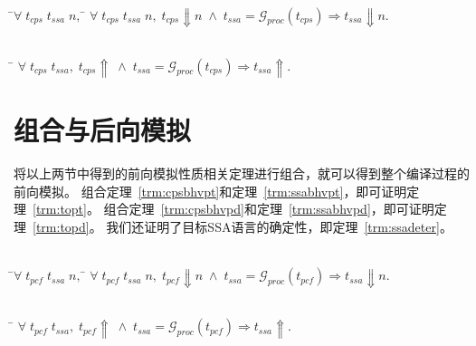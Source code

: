 \begin{theorem}[SSA程序对CPS程序终止行为的保存]\label{trm:ssabhvpt} 
    \begin{tabbing}
     \\
    \quad\=$\forall \; t_{cps}\; t_{ssa}\; n,\; $\=\kill
    \>$\forall \; t_{cps}\; t_{ssa}\; n,\; t_{cps}\Downarrow n\; \wedge \; t_{ssa}=\mathcal{G}_{proc}(t_{cps}) \Longrightarrow t_{ssa}\Downarrow n.$
    \end{tabbing}
  \end{theorem}
  
  \begin{theorem}[SSA程序对CPS程序发散行为的保存]\label{trm:ssabhvpd}
    \begin{tabbing}
      \\
    \quad\=\kill
    \>$\forall \; t_{cps}\; t_{ssa},\; t_{cps}\Uparrow\; \wedge \; t_{ssa}=\mathcal{G}_{proc}(t_{cps})\Longrightarrow t_{ssa}\Uparrow.$
    \end{tabbing}
  \end{theorem}

\section{组合与后向模拟}

将以上两节中得到的前向模拟性质相关定理进行组合，就可以得到整个编译过程的前向模拟。
组合定理~\ref{trm:cpsbhvpt}和定理~\ref{trm:ssabhvpt}，即可证明定理~\ref{trm:topt}。
组合定理~\ref{trm:cpsbhvpd}和定理~\ref{trm:ssabhvpd}，即可证明定理~\ref{trm:topd}。
我们还证明了目标SSA语言的确定性，即定理~\ref{trm:ssadeter}。

  \begin{theorem}[SSA程序对PCF程序终止行为的保存]\label{trm:topt} 
    \begin{tabbing}
     \\
    \quad\=$\forall \; t_{pcf}\; t_{ssa}\; n,\; $\=\kill
    \>$\forall \; t_{pcf}\; t_{ssa}\; n,\; t_{pcf}\Downarrow n\; \wedge \; t_{ssa}=\mathcal{G}_{proc}(t_{pcf}) \Longrightarrow t_{ssa}\Downarrow n.$
    \end{tabbing}
  \end{theorem}
  
  \begin{theorem}[SSA程序对PCF程序发散行为的保存]\label{trm:topd}
    \begin{tabbing}
      \\
    \quad\=\kill
    \>$\forall \; t_{pcf}\; t_{ssa},\; t_{pcf}\Uparrow\; \wedge \; t_{ssa}=\mathcal{G}_{proc}(t_{pcf})\Longrightarrow t_{ssa}\Uparrow.$
    \end{tabbing}
  \end{theorem}  

